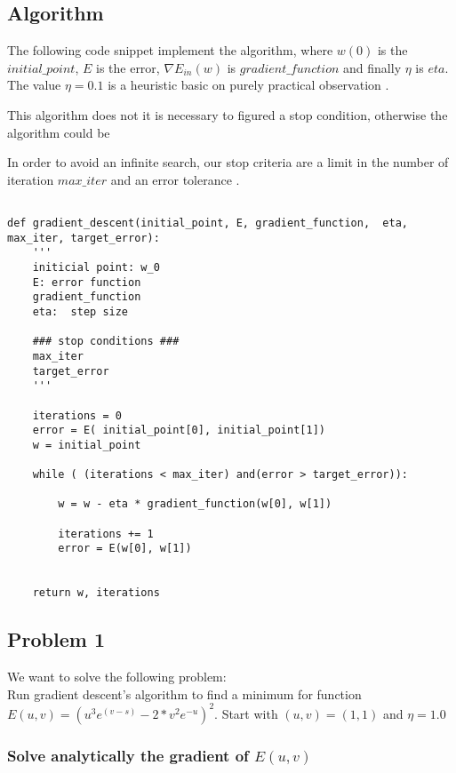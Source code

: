 \subsection{Algorithm}

The following code snippet implement the algorithm, where $w(0)$ is the $initial\_point$, $E$ is the error, $\nabla E_{in}(w)$ is $gradient\_function$ and
finally $\eta$ is $eta.$ The value $\eta = 0.1$ is a heuristic basic on purely practical observation \cite{LFD}.

This algorithm does not  it is necessary to figured a stop condition, otherwise the algorithm could be

In order to avoid an infinite search, our stop criteria are a limit in the number of iteration $max\_iter$ and an error tolerance . 

\begin{verbatim}

def gradient_descent(initial_point, E, gradient_function,  eta, max_iter, target_error):
    '''
    initicial point: w_0 
    E: error function 
    gradient_function
    eta:  step size 

    ### stop conditions ###
    max_iter
    target_error
    '''

    iterations = 0
    error = E( initial_point[0], initial_point[1])
    w = initial_point
  
    while ( (iterations < max_iter) and(error > target_error)): 

        w = w - eta * gradient_function(w[0], w[1])
        
        iterations += 1
        error = E(w[0], w[1])
 
    
    return w, iterations

\end{verbatim}

\subsection{Problem 1}

We want to solve the following problem: \\

Run gradient descent's algorithm to find a minimum for
function $E(u,v) = (u^3 e^{(v-s)} - 2* v^2 e^{-u})^2.$
Start with $(u,v)=(1,1)$ and $\eta = 1.0$


\subsubsection{Solve analytically the gradient of $E(u,v)$}


